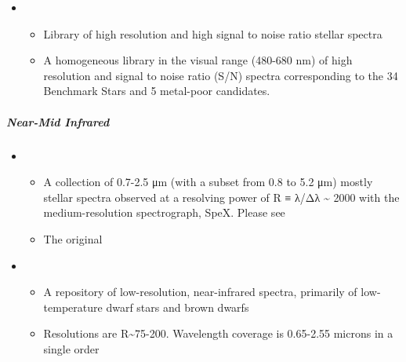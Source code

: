 \documentclass[letterpaper,10pt,english]{sphinxmanual}
\begin{document}
\begin{itemize}
\begin{itemize}
\end{itemize}

\item {} 
\begin{itemize}
\item {} 
Library of high resolution and high signal to noise ratio stellar
spectra

\item {} 
A homogeneous library in the visual range (480-680 nm) of high
resolution and signal to noise ratio (S/N) spectra corresponding
to the 34 Benchmark Stars and 5 metal-poor candidates.

\end{itemize}

\end{itemize}


\subparagraph{Near-Mid Infrared}
\label{\detokenize{resource/astro/topics/stellar_and_spops:near-mid-infrared}}\begin{itemize}
\item {} 
\begin{itemize}
\item {} 
A collection of 0.7-2.5 μm (with a subset from 0.8 to 5.2 μm)
mostly stellar spectra observed at a resolving power of R ≡ λ/Δλ \textasciitilde{}
2000 with the medium-resolution spectrograph, SpeX. Please see

\item {} 
The original 

\end{itemize}

\item {} 
\begin{itemize}
\item {} 
A repository of low-resolution, near-infrared spectra, primarily
of low-temperature dwarf stars and brown dwarfs

\item {} 
Resolutions are R\textasciitilde{}75-200. Wavelength coverage is 0.65-2.55 microns
in a single order

\end{itemize}

\end{itemize}
\end{document}
